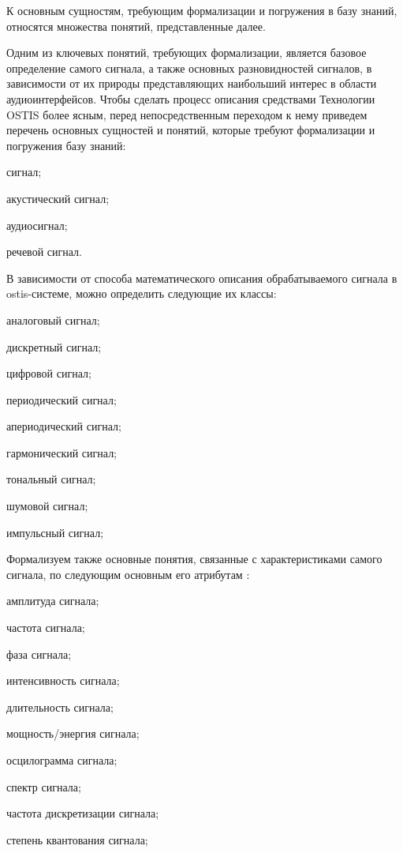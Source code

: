 К основным сущностям, требующим формализации и погружения в базу знаний, относятся множества понятий, представленные далее. 

Одним из ключевых понятий, требующих формализации, является базовое определение самого сигнала, а также основных разновидностей сигналов, в зависимости от их природы представляющих наибольший интерес в области аудиоинтерфейсов. Чтобы сделать процесс описания средствами Технологии OSTIS более ясным, перед непосредственным переходом к нему приведем перечень основных сущностей и понятий, которые требуют формализации и погружения базу знаний:

\begin{textitemize}    
    \item сигнал;
    \item акустический сигнал;
    \item аудиосигнал;
    \item речевой сигнал.
\end{textitemize}

В зависимости от способа математического описания обрабатываемого сигнала в ostis-системе, можно определить следующие их классы:

\begin{textitemize}    
    \item аналоговый сигнал;
    \item дискретный сигнал;
    \item цифровой сигнал;
    \item периодический сигнал;
    \item апериодический сигнал;
    \item гармонический сигнал;
    \item тональный сигнал;
    \item шумовой сигнал;
    \item импульсный сигнал;
\end{textitemize}

Формализуем также основные понятия, связанные с характеристиками самого сигнала, по следующим основным его атрибутам \textit{}:
\begin{textitemize}  
    \item амплитуда сигнала;
    \item частота сигнала;
    \item фаза сигнала;
    \item интенсивность сигнала;
    \item длительность сигнала;
    \item мощность/энергия сигнала;
    \item осцилограмма сигнала;
    \item спектр сигнала;
    \item частота дискретизации сигнала;
    \item степень квантования сигнала;
\end{textitemize}

